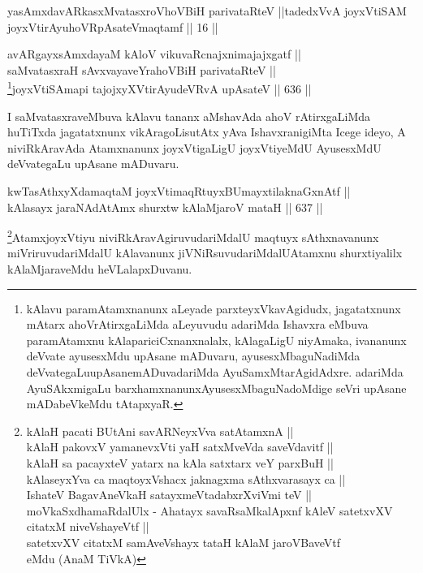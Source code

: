 

\begin{kandikeshl}
yasAmxdavARkasxMvatasxroV\s hoVBiH parivataRteV ||tadedxVvA joyxVtiSAM joyxVtirAyuhoVRpAsateV\s maqtamf || 16 ||
\end{kandikeshl}

\begin{shl}
avARgayxsAmxdayaM kAloV vikuvaRcnajxnimajajxgatf || \\
saMvatasxraH sAvxvayaveYrahoVBiH parivataRteV || \\
\footnote{kAlavu paramAtamxnanunx aLeyade parxteyxVkavAgidudx, jagatatxnunx mAtarx ahoVrAtirxgaLiMda aLeyuvudu adariMda Ishavxra eMbuva paramAtamxnu kAlapariciCxnanxnalalx, kAlagaLigU niyAmaka, ivananunx deVvate ayusesxMdu upAsane mADuvaru, ayusesxMbaguNadiMda deVvategaLu\break upAsanemADuvadariMda AyuSamxMtarAgidAdxre. adariMda AyuSAkxmigaLu barxhamxnanunx\break AyusesxMbaguNadoMdige seVri upAsane mADabeVkeMdu tAtapxyaR.}joyxVtiSAmapi tajojxyXVtirAyudeVRvA upAsateV \hfill || 636 ||  
\end{shl}


\begin{artha}
I saMvatasxraveMbuva kAlavu tananx aMshavAda ahoV
rAtirxgaLiMda huTiTxda jagatatxnunx vikAragoLisutAtx yAva
IshavxranigiMta Icege ideyo, A niviRkAravAda Atamxnanunx joyxVtigaLigU
joyxVtiyeMdU AyusesxMdU deVvategaLu upAsane mADuvaru.
\end{artha}



\begin{shl}
kwTasAthxyXdamaqtaM joyxVtimaqRtuyxBUmayxtilaknaGxnAtf ||  \\
kAlasayx jaraNAdAtAmx shurxtw kAlaMjaroV mataH \hfill || 637 ||  
\end{shl}

\begin{artha}
\footnote{kAlaH pacati BUtAni savARNeyxVva satA\s \s tamxnA ||\\ kAlaH pakovxV yamanevxVti yaH satxMveVda saveVdavitf ||\\ kAlaH sa pacayxteV yatarx na kAla satxtarx veY parxBuH ||\\ kAlaseyxYva ca maqtoyxVshacx jaknagxma sAthxvarasayx ca ||\\ IshateV BagavAneVkaH satayxmeVtadabxrXviVmi teV || moVkaSxdhamaRdalUlx - Ahatayx savaRsaMkalApxnf kAleV satetxvXV citatxM niveVshayeVtf ||\\ satetxvXV citatxM samAveVshayx tataH kAlaM jaroVBaveVtf \\  eMdu (AnaM TiVkA)}AtamxjoyxVtiyu niviRkAravAgiruvudariMdalU maqtuyx sAthxnavanunx miVriruvudariMdalU kAlavanunx jiVNiRsuvudariMdalU\break Atamxnu shurxtiyalilx kAlaMjaraveMdu heVLalapxDuvanu.
\end{artha}

